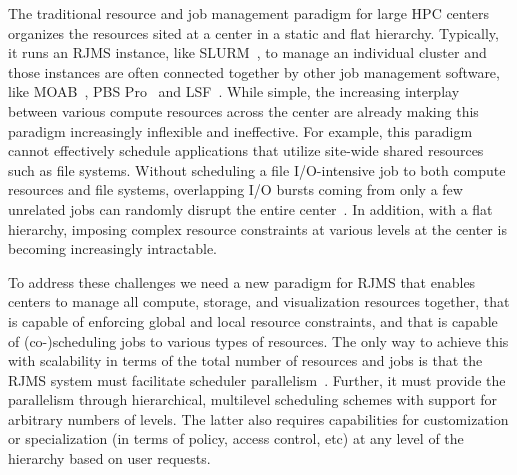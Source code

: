 The traditional resource and job management paradigm
for large HPC centers organizes the resources sited
at a center in a static and flat hierarchy. Typically, it 
runs an RJMS instance, like SLURM~\cite{Jette02slurm}, to manage an individual cluster
and those instances are often connected together by 
other job management software, like MOAB~\cite{MOAB}, PBS Pro~\cite{PSBPro} and LSF~\cite{LSF}.
While simple, the increasing interplay 
between various compute resources across the center
are already making this paradigm increasingly 
inflexible and ineffective. 
For example, this paradigm cannot effectively
schedule applications that utilize site-wide shared 
resources such as file systems. 
Without scheduling a file I/O-intensive job 
to both compute resources and file systems, 
overlapping I/O bursts coming from only a few
unrelated jobs can randomly disrupt the entire center~\cite{SCR,SPINDLE}. 
In addition, with a flat hierarchy, imposing complex 
resource constraints at various levels at the center
is becoming increasingly intractable. 

To address these challenges we need 
a new paradigm for RJMS that enables centers to manage
all compute, storage, and visualization resources together, 
that is capable of enforcing global and local resource constraints,
and that
is capable of 
(co-)scheduling jobs to various types of resources.
The only way to achieve this with scalability in terms of the total number 
of resources and jobs is that the RJMS system must 
facilitate scheduler parallelism~\cite{Omega,Mesos}. Further, it must
provide the parallelism through hierarchical, multilevel 
scheduling schemes with support for arbitrary numbers of levels.
The latter also requires capabilities for customization or specialization (in terms
of policy, access control, etc) at any level of the hierarchy based on user requests.

